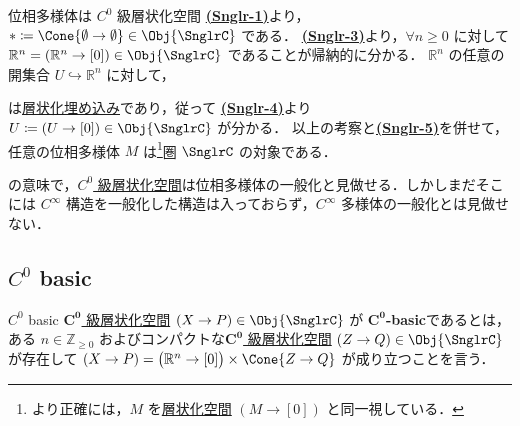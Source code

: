 \documentclass[TQFT_main]{subfiles}
\begin{document}
\begin{myexample}[label=ex:topomfld]{位相多様体は $C^0$ 級層状化空間}
    \hyperref[def:Snglr-C0]{\textsf{\textbf{(Snglr-1)}}}より，$* \coloneqq \Cone{\emptyset \to \emptyset} \in \Obj{\SnglrC}$ である．
    \hyperref[def:Snglr-C0]{\textsf{\textbf{(Snglr-3)}}}より，$\forall n \ge 0$ に対して $\mathbb{R}^n = (\mathbb{R}^n \to [0]) \in \Obj{\SnglrC}$ であることが帰納的に分かる．
    $\mathbb{R}^n$ の任意の開集合 $U \hookrightarrow \mathbb{R}^n$ に対して，
    \begin{center}
    \end{center}
    は\hyperref[def:strat-emb]{層状化埋め込み}であり，従って \hyperref[def:Snglr-C0]{\textsf{\textbf{(Snglr-4)}}}より $U \coloneqq (U \to [0]) \in \Obj{\SnglrC}$ が分かる．
    以上の考察と\hyperref[def:Snglr-C0]{\textsf{\textbf{(Snglr-5)}}}を併せて，任意の位相多様体 $M$ は\footnote{より正確には，$M$ を\hyperref[def:stratified-space]{層状化空間} $(M \to [0])$ と同一視している．}圏 $\SnglrC$ の対象である．
\end{myexample}

の意味で，\hyperref[def:Snglr-C0]{$C^0$ 級層状化空間}は位相多様体の一般化と見做せる．しかしまだそこには $C^\infty$ 構造を一般化した構造は入っておらず，$C^\infty$ 多様体の一般化とは見做せない．

\subsection{$C^0$ basic}

\begin{mydef}[label=def:C0-basic]{$C^0$ basic}
    \hyperref[def:Snglr-C0]{$\bm{C^0}$ 級層状化空間} $(X \to P) \in \Obj{\SnglrC}$ が $\bm{C^0}$\textbf{-basic}であるとは，ある $n \in \mathbb{Z}_{\ge 0}$ およびコンパクトな\hyperref[def:Snglr-C0]{$\bm{C^0}$ 級層状化空間} $(Z \to Q) \in \Obj{\SnglrC}$ が存在して
    $(X \to P) = \bigl(\mathbb{R}^n \to [0]\bigr) \times \Cone{Z \to Q}$ が成り立つことを言う．
\end{mydef}
\end{document}
